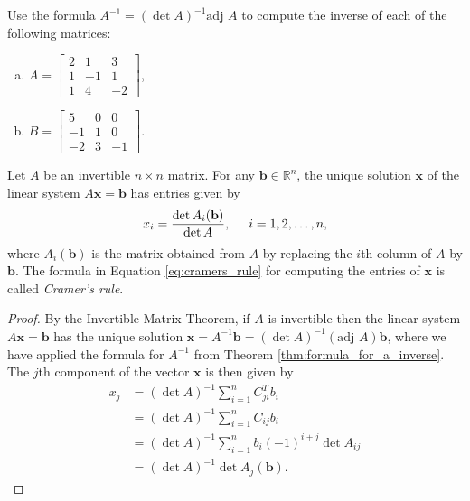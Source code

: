 \documentclass[12pt,letterpaper,reqno]{article}
\numberwithin{equation}{section}
\begin{document}
\begin{exercise}
Use the formula $A^{-1}=(\det A)^{-1}\text{adj }A$ to compute the inverse of each of the following matrices:
\begin{enumerate}[(a)]
	\item $A=\begin{bmatrix}
		2 & 1 & 3 \\
		1 & -1 & 1 \\
		1 & 4 & -2
	\end{bmatrix}$,
	\item $B=\begin{bmatrix}
		5 & 0 & 0 \\
		-1 & 1 & 0 \\
		-2 & 3 & -1
	\end{bmatrix}$.
\end{enumerate}	
\end{exercise}

\begin{thm}
	Let $A$ be an invertible $n \times n$ matrix. For any $\mathbf{b} \in \mathbb{R}^n$, the unique solution $\mathbf{x}$ of the linear system $A\mathbf{x}=\mathbf{b}$ has entries given by 
	\begin{align}\label{eq:cramers_rule}
		x_i=\frac{\det A_i(\mathbf{b})}{\det A}, \hspace{0.5cm} i=1,2,\dots,n,
	\end{align}
	where $A_i(\mathbf{b})$ is the matrix obtained from $A$ by replacing the $i$th column of $A$ by $\mathbf{b}$. The formula in Equation \eqref{eq:cramers_rule} for computing the entries of $\mathbf{x}$ is called \emph{Cramer's rule}.
\end{thm}

\begin{proof}
By the Invertible Matrix Theorem, if $A$ is invertible then the linear system $A\mathbf{x}=\mathbf{b}$ has the unique solution $\mathbf{x}=A^{-1}\mathbf{b}=(\det A)^{-1}(\text{adj }A)\mathbf{b}$, where we have applied the formula for $A^{-1}$ from Theorem \ref{thm:formula_for_a_inverse}. The $j$th component of the vector $\mathbf{x}$ is then given by
\begin{align*}
	x_j&=(\det A)^{-1}\sum_{i=1}^nC_{ji}^Tb_i \\
	&=(\det A)^{-1}\sum_{i=1}^nC_{ij}b_i \\
	&=(\det A)^{-1}\sum_{i=1}^nb_i(-1)^{i+j}\det A_{ij} \\
	&=(\det A)^{-1}\det A_j(\mathbf{b}).
\end{align*}	
\end{proof}
\end{document}
